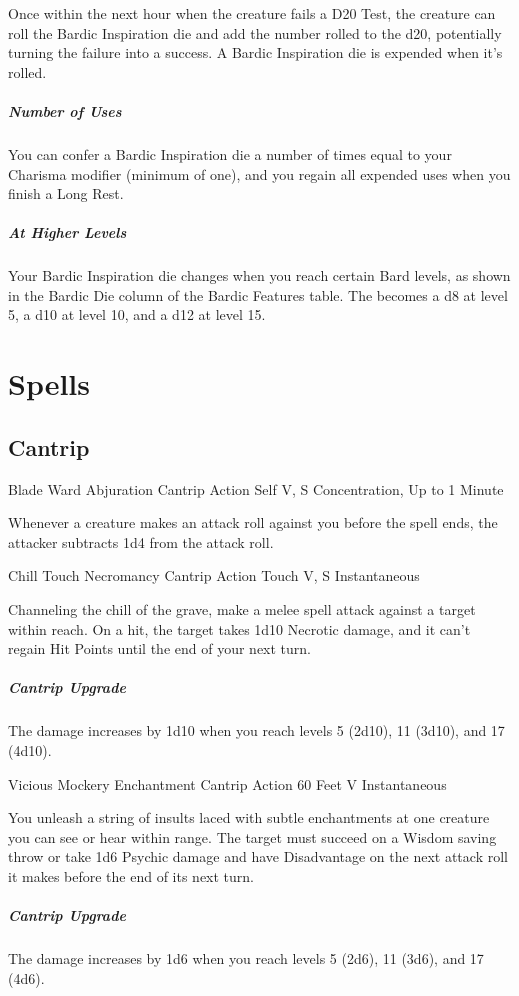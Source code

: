 \documentclass[letterpaper,openany,oneside,twocolumn]{book}
\begin{document}
Once within the next hour when the creature fails a D20 Test, the creature can roll the Bardic Inspiration die and add the number rolled to the d20, potentially turning the failure into a success. A Bardic Inspiration die is expended when it's rolled.
\subparagraph*{Number of Uses}
You can confer a Bardic Inspiration die a number of times equal to your Charisma modifier (minimum of one), and you regain all expended uses when you finish a Long Rest.
\subparagraph*{At Higher Levels}
Your Bardic Inspiration die changes when you reach certain Bard levels, as shown in the Bardic Die column of the Bardic Features table. The becomes a d8 at level 5, a d10 at level 10, and a d12 at level 15.

\section*{Spells}
\subsection*{Cantrip}

\DndSpellHeader
  {Blade Ward}
  {Abjuration Cantrip}
  {Action}
  {Self}
  {V, S}
  {Concentration, Up to 1 Minute}

Whenever a creature makes an attack roll against you before the spell ends, the attacker subtracts 1d4 from the attack roll.

\DndSpellHeader
  {Chill Touch}
  {Necromancy Cantrip}
  {Action}
  {Touch}
  {V, S}
  {Instantaneous}

Channeling the chill of the grave, make a melee spell attack against a target within reach. On a hit, the target takes 1d10 Necrotic damage, and it can't regain Hit Points until the end of your next turn.

\subparagraph*{Cantrip Upgrade} The damage increases by 1d10 when you reach levels 5 (2d10), 11 (3d10), and 17 (4d10).

\DndSpellHeader
  {Vicious Mockery}
  {Enchantment Cantrip}
  {Action}
  {60 Feet}
  {V}
  {Instantaneous}

You unleash a string of insults laced with subtle enchantments at one creature you can see or hear within range. The target must succeed on a Wisdom saving throw or take 1d6 Psychic damage and have Disadvantage on the next attack roll it makes before the end of its next turn.

\subparagraph*{Cantrip Upgrade} The damage increases by 1d6 when you reach levels 5 (2d6), 11 (3d6), and 17 (4d6).
\end{document}
